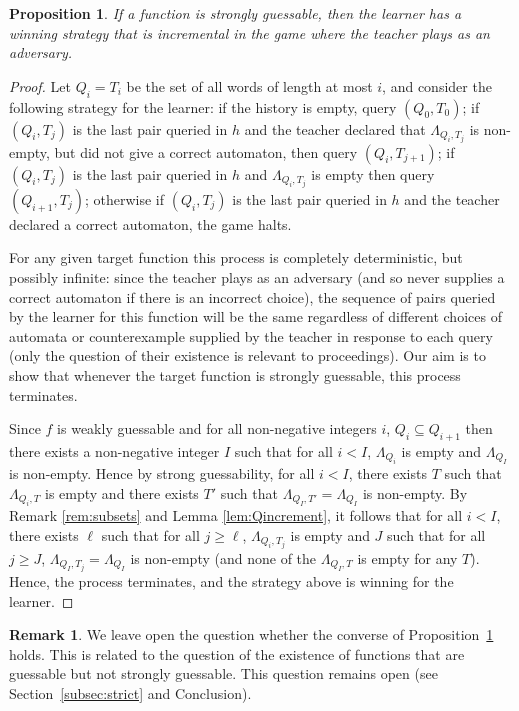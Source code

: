 \documentclass[10pt,a4paper]{amsart}
\newtheorem{prop}[thm]{Proposition}
\theoremstyle{definition}
\newtheorem{rem}[thm]{Remark}
\numberwithin{equation}{section}
\numberwithin{theorem}{section}
\begin{document}
\begin{prop}
\label{prop:game}If a function is strongly guessable, then the learner has a winning strategy that is incremental in the game where the teacher plays as an adversary.
\end{prop}



\begin{proof}
Let $Q_i = T_i$ be the set of all words of length at most $i$, and consider the following strategy for the learner: if the history is empty, query $(Q_0,T_0)$; if $(Q_i, T_j)$ is the last pair queried in $h$ and the teacher declared that $\Lambda_{Q_i,T_j}$ is non-empty, but did not give a correct automaton, then query $(Q_i, T_{j+1})$; if $(Q_i, T_j)$ is the last pair queried in $h$ and $\Lambda_{Q_i,T_j}$ is empty then query $(Q_{i+1}, T_{j})$; otherwise if $(Q_i, T_j)$ is the last pair queried in $h$ and the teacher declared a correct automaton, the game halts.

For any given target function this process is completely deterministic, but possibly infinite: since the teacher plays as an adversary (and so never supplies a correct automaton if there is an incorrect choice), the sequence of pairs queried by the learner for this function will be the same regardless of different choices of automata or counterexample supplied by the teacher in response to each query (only the question of their existence is relevant to proceedings). Our aim is to show that whenever the target function is strongly guessable, this process terminates. 

Since $f$ is weakly guessable and for all non-negative integers $i$, $Q_i \subseteq Q_{i+1}$ then there exists a non-negative integer $I$ such that for all $i< I$, $\Lambda_{Q_i}$ is empty and $\Lambda_{Q_I}$ is non-empty. Hence by strong guessability, for all $i< I$, there exists $T$ such that $\Lambda_{Q_i,T}$ is empty and there exists $T'$ such that $\Lambda_{Q_I,T'} = \Lambda_{Q_I}$ is non-empty. By Remark \ref{rem:subsets} and Lemma \ref{lem:Qincrement}, it follows that for all $i< I$, there exists $\ell$ such that for all $j\geq \ell$, $\Lambda_{Q_i,T_j}$ is empty and $J$ such that for all $j\geq J$, $\Lambda_{Q_I,T_j} = \Lambda_{Q_I}$ is non-empty (and none of the $\Lambda_{Q_I,T}$ is empty for any $T$).
Hence, the process terminates, and the strategy above is winning for the learner.
\end{proof}


\begin{rem}
We leave open the question whether the converse of Proposition~\ref{prop:game} holds. This is related to the question of the existence of functions that are guessable but not strongly guessable. This question remains open (see Section~\ref{subsec:strict} and Conclusion).
\end{rem}
\end{document}
